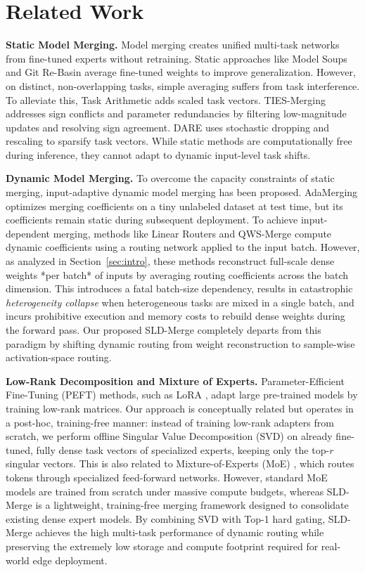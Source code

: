 \section{Related Work}
\label{sec:related_work}

\textbf{Static Model Merging.}
Model merging creates unified multi-task networks from fine-tuned experts without retraining. Static approaches like Model Soups \cite{wortsman2022model} and Git Re-Basin \cite{ainsworth2022git} average fine-tuned weights to improve generalization. However, on distinct, non-overlapping tasks, simple averaging suffers from task interference. To alleviate this, Task Arithmetic \cite{ilharco2022editing} adds scaled task vectors. TIES-Merging \cite{yadav2023ties} addresses sign conflicts and parameter redundancies by filtering low-magnitude updates and resolving sign agreement. DARE \cite{yu2024dare} uses stochastic dropping and rescaling to sparsify task vectors. While static methods are computationally free during inference, they cannot adapt to dynamic input-level task shifts.

\textbf{Dynamic Model Merging.}
To overcome the capacity constraints of static merging, input-adaptive dynamic model merging has been proposed. AdaMerging \cite{yang2023adamerging} optimizes merging coefficients on a tiny unlabeled dataset at test time, but its coefficients remain static during subsequent deployment. 
To achieve input-dependent merging, methods like Linear Routers and QWS-Merge compute dynamic coefficients using a routing network applied to the input batch. 
However, as analyzed in Section~\ref{sec:intro}, these methods reconstruct full-scale dense weights *per batch* of inputs by averaging routing coefficients across the batch dimension. This introduces a fatal batch-size dependency, results in catastrophic \emph{heterogeneity collapse} when heterogeneous tasks are mixed in a single batch, and incurs prohibitive execution and memory costs to rebuild dense weights during the forward pass. Our proposed SLD-Merge completely departs from this paradigm by shifting dynamic routing from weight reconstruction to sample-wise activation-space routing.

\textbf{Low-Rank Decomposition and Mixture of Experts.}
Parameter-Efficient Fine-Tuning (PEFT) methods, such as LoRA \cite{dettmers2024qlora}, adapt large pre-trained models by training low-rank matrices. Our approach is conceptually related but operates in a post-hoc, training-free manner: instead of training low-rank adapters from scratch, we perform offline Singular Value Decomposition (SVD) on already fine-tuned, fully dense task vectors of specialized experts, keeping only the top-$r$ singular vectors. This is also related to Mixture-of-Experts (MoE) \cite{shazeer2017outrageously, fedus2022switch}, which routes tokens through specialized feed-forward networks. However, standard MoE models are trained from scratch under massive compute budgets, whereas SLD-Merge is a lightweight, training-free merging framework designed to consolidate existing dense expert models.
By combining SVD with Top-1 hard gating, SLD-Merge achieves the high multi-task performance of dynamic routing while preserving the extremely low storage and compute footprint required for real-world edge deployment.
